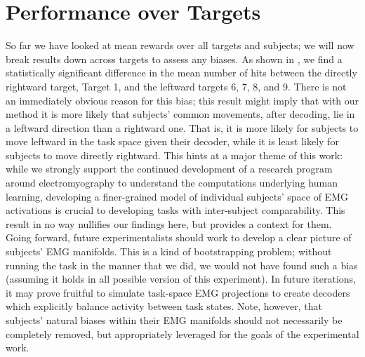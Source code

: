 \documentclass[../main.tex]{subfiles}
\begin{document}
\section{Performance over Targets}

So far we have looked at mean rewards over all targets and subjects; we will now break results down across targets to assess any biases. As shown in , we find a statistically significant difference in the mean number of hits between the directly rightward target, Target 1, and the leftward targets 6, 7, 8, and 9. There is not an immediately obvious reason for this bias; this result might imply that with our method it is more likely that subjects' common movements, after decoding, lie in a leftward direction than a rightward one. That is, it is more likely for subjects to move leftward in the task space given their decoder, while it is least likely for subjects to move directly rightward. This hints at a major theme of this work: while we strongly support the continued development of a research program around electromyography to understand the computations underlying human learning, developing a finer-grained model of individual subjects' space of EMG activations is crucial to developing tasks with inter-subject comparability. This result in no way nullifies our findings here, but provides a context for them. Going forward, future experimentalists should work to develop a clear picture of subjects' EMG manifolds. This is a kind of bootstrapping problem; without running the task in the manner that we did, we would not have found such a bias (assuming it holds in all possible version of this experiment). In future iterations, it may prove fruitful to simulate task-space EMG projections to create decoders which explicitly balance activity between task states. Note, however, that subjects' natural biases within their EMG manifolds should not necessarily be completely removed, but appropriately leveraged for the goals of the experimental work.

\end{document}
